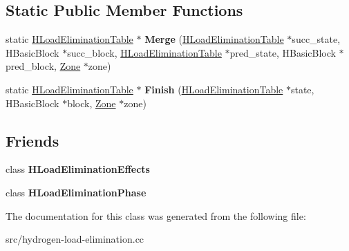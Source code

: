 \subsection*{Static Public Member Functions}
\begin{DoxyCompactItemize}
\item 
\hypertarget{classv8_1_1internal_1_1_h_load_elimination_table_a9001c21ba1ec2f88eeea97ce30b9e5a1}{}static \hyperlink{classv8_1_1internal_1_1_h_load_elimination_table}{H\+Load\+Elimination\+Table} $\ast$ {\bfseries Merge} (\hyperlink{classv8_1_1internal_1_1_h_load_elimination_table}{H\+Load\+Elimination\+Table} $\ast$succ\+\_\+state, H\+Basic\+Block $\ast$succ\+\_\+block, \hyperlink{classv8_1_1internal_1_1_h_load_elimination_table}{H\+Load\+Elimination\+Table} $\ast$pred\+\_\+state, H\+Basic\+Block $\ast$pred\+\_\+block, \hyperlink{classv8_1_1internal_1_1_zone}{Zone} $\ast$zone)\label{classv8_1_1internal_1_1_h_load_elimination_table_a9001c21ba1ec2f88eeea97ce30b9e5a1}

\item 
\hypertarget{classv8_1_1internal_1_1_h_load_elimination_table_a36e1240b3cbc2a9828f42e0c1b18fbcf}{}static \hyperlink{classv8_1_1internal_1_1_h_load_elimination_table}{H\+Load\+Elimination\+Table} $\ast$ {\bfseries Finish} (\hyperlink{classv8_1_1internal_1_1_h_load_elimination_table}{H\+Load\+Elimination\+Table} $\ast$state, H\+Basic\+Block $\ast$block, \hyperlink{classv8_1_1internal_1_1_zone}{Zone} $\ast$zone)\label{classv8_1_1internal_1_1_h_load_elimination_table_a36e1240b3cbc2a9828f42e0c1b18fbcf}

\end{DoxyCompactItemize}
\subsection*{Friends}
\begin{DoxyCompactItemize}
\item 
\hypertarget{classv8_1_1internal_1_1_h_load_elimination_table_a0ea56273a59d73214d283f82893e5705}{}class {\bfseries H\+Load\+Elimination\+Effects}\label{classv8_1_1internal_1_1_h_load_elimination_table_a0ea56273a59d73214d283f82893e5705}

\item 
\hypertarget{classv8_1_1internal_1_1_h_load_elimination_table_a731516ccfd3fc2a75f4c50eb591ec9df}{}class {\bfseries H\+Load\+Elimination\+Phase}\label{classv8_1_1internal_1_1_h_load_elimination_table_a731516ccfd3fc2a75f4c50eb591ec9df}

\end{DoxyCompactItemize}


The documentation for this class was generated from the following file\+:\begin{DoxyCompactItemize}
\item 
src/hydrogen-\/load-\/elimination.\+cc\end{DoxyCompactItemize}
